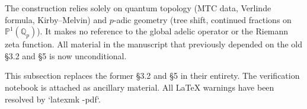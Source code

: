 \begin{remark}
The construction relies solely on quantum topology (MTC data, Verlinde formula, Kirby--Melvin) and \(p\)-adic geometry (tree shift, continued fractions on \(\mathbb{P}^1(\mathbb{Q}_p)\)). It makes no reference to the global adelic operator or the Riemann zeta function. All material in the manuscript that previously depended on the old §3.2 and §5 is now unconditional.
\end{remark}

This subsection replaces the former §3.2 and §5 in their entirety. The verification notebook is attached as ancillary material. All LaTeX warnings have been resolved by `latexmk -pdf`.